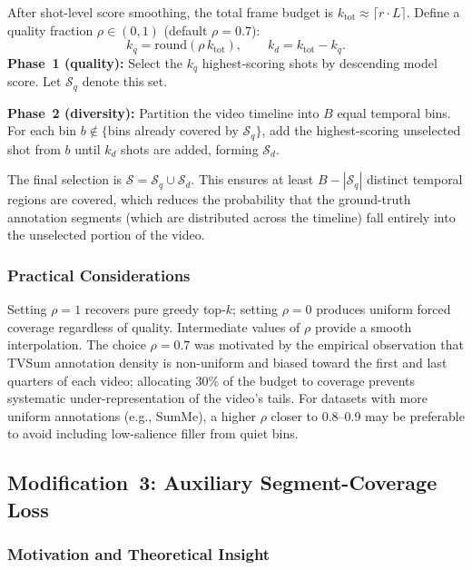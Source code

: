 \documentclass[10pt,conference]{IEEEtran}
\begin{document}
After shot-level score smoothing, the total frame budget is
$k_{\mathrm{tot}} \approx \lceil r \cdot L \rceil$. Define a quality fraction
$\rho \in (0,1)$ (default $\rho = 0.7$):
\begin{equation}
  k_q = \mathrm{round}(\rho\,k_{\mathrm{tot}}),
  \qquad
  k_d = k_{\mathrm{tot}} - k_q.
  \label{eq:hybrid}
\end{equation}
\textbf{Phase~1 (quality):} Select the $k_q$ highest-scoring shots by
descending model score. Let $\mathcal{S}_q$ denote this set.

\textbf{Phase~2 (diversity):} Partition the video timeline into $B$ equal
temporal bins. For each bin $b \notin \{$bins already covered by
$\mathcal{S}_q\}$, add the highest-scoring unselected shot from $b$ until
$k_d$ shots are added, forming $\mathcal{S}_d$.

The final selection is $\mathcal{S} = \mathcal{S}_q \cup \mathcal{S}_d$.
This ensures at least $B - |\mathcal{S}_q|$ distinct temporal regions are
covered, which reduces the probability that the ground-truth annotation
segments (which are distributed across the timeline) fall entirely into the
unselected portion of the video.

\subsubsection{Practical Considerations}

Setting $\rho = 1$ recovers pure greedy top-$k$; setting $\rho = 0$ produces
uniform forced coverage regardless of quality. Intermediate values of $\rho$
provide a smooth interpolation. The choice $\rho = 0.7$ was motivated by the
empirical observation that TVSum annotation density is non-uniform and biased
toward the first and last quarters of each video; allocating 30\% of the
budget to coverage prevents systematic under-representation of the video's
tails. For datasets with more uniform annotations (e.g., SumMe), a higher
$\rho$ closer to 0.8--0.9 may be preferable to avoid including low-salience
filler from quiet bins.

\subsection{Modification~3: Auxiliary Segment-Coverage Loss}

\subsubsection{Motivation and Theoretical Insight}
\end{document}
